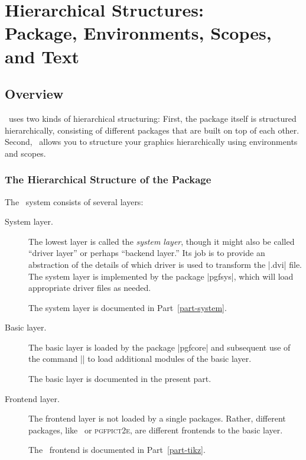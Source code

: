 %
%
%


\section[Hierarchical Structures: Package, Environments, Scopes, and Text]
{Hierarchical Structures:\\
  Package, Environments, Scopes, and Text}


\subsection{Overview}

\pgfname\ uses two kinds of hierarchical structuring: First, the
package itself is structured hierarchically, consisting of different
packages that are built on top of each other. Second, \pgfname\ allows you
to structure your graphics hierarchically using environments and scopes.

\subsubsection{The  Hierarchical Structure of the Package}

The \pgfname\ system consists of several layers:

\begin{description}
\item[System layer.]
  The lowest layer is called the \emph{system layer}, though it might
  also be called ``driver layer'' or perhaps ``backend layer.'' Its
  job is to provide an abstraction of the details of which driver
  is used to transform the |.dvi| file. The system layer is
  implemented by the package |pgfsys|, which will load appropriate
  driver files as needed.

  The system layer is documented in Part~\ref{part-system}.
\item[Basic layer.]
  The basic layer is loaded by the package |pgfcore| and subsequent
  use of the command |\usepgfmodule| to load additional modules of the
  basic layer.

  The basic layer is documented in the present part.
\item[Frontend layer.]
  The frontend layer is not loaded by a single packages. Rather,
  different packages, like \tikzname\ or \textsc{pgfpict2e}, are
  different frontends to the basic layer.

  The \tikzname\ frontend is documented in Part~\ref{part-tikz}.
\end{description}

